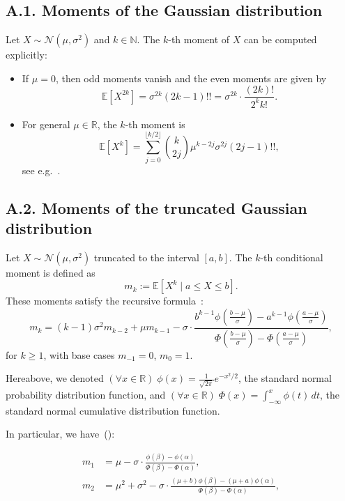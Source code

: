 \documentclass[review]{elsarticle}
\begin{document}
\subsection*{A.1. Moments of the Gaussian distribution}

Let $X \sim \mathcal{N}(\mu, \sigma^2)$ and $k \in \mathbb{N}$. The $k$-th moment of $X$ can be computed explicitly:

\begin{itemize}
    \item If $\mu = 0$, then odd moments vanish and the even moments are given by
    $$
    \mathbb{E}[X^{2k}] = \sigma^{2k} (2k - 1)!! = \sigma^{2k} \cdot \frac{(2k)!}{2^k k!}.
    $$
    \item For general $\mu \in \mathbb{R}$, the $k$-th moment is
    $$
    \mathbb{E}[X^k] = \sum_{j = 0}^{\lfloor k/2 \rfloor} \binom{k}{2j} \mu^{k - 2j} \sigma^{2j} (2j - 1)!!,
    $$
    see e.g.~\cite{jorge2018}.
\end{itemize}

\subsection*{A.2. Moments of the truncated Gaussian distribution}

Let $X \sim \mathcal{N}(\mu, \sigma^2)$ truncated to the interval $[a, b]$. The $k$-th conditional moment is defined as
$$
m_k := \mathbb{E}[X^k \mid a \leq X \leq b].
$$
These moments satisfy the recursive formula~\cite{Orjebin2014}:
$$
m_k = (k-1)\sigma^2 m_{k-2} + \mu m_{k-1} - \sigma \cdot \frac{b^{k-1} \phi\left(\frac{b - \mu}{\sigma}\right) - a^{k-1} \phi\left(\frac{a - \mu}{\sigma}\right)}{\Phi\left(\frac{b - \mu}{\sigma}\right) - \Phi\left(\frac{a - \mu}{\sigma}\right)},
$$
for $k \geq 1$, with base cases $m_{-1} = 0$, $m_0 = 1$.

Hereabove, we denoted $(\forall x \in \mathbb{R}) \;\phi(x) = \frac{1}{\sqrt{2\pi}} e^{-x^2/2}$, the standard normal probability distribution function, and $(\forall x \in \mathbb{R}) \; \Phi(x) = \int_{-\infty}^x \phi(t)\,dt$, the standard normal cumulative distribution function.

In particular, we have~(\cite{Orjebin2014,jorge2018}):

\begin{align*}
m_1 &= \mu - \sigma \cdot \frac{\phi(\beta) - \phi(\alpha)}{\Phi(\beta) - \Phi(\alpha)}, \\
m_2 &= \mu^2 + \sigma^2 - \sigma \cdot \frac{(\mu + b)\phi(\beta) - (\mu + a)\phi(\alpha)}{\Phi(\beta) - \Phi(\alpha)},
\end{align*}
\end{document}

